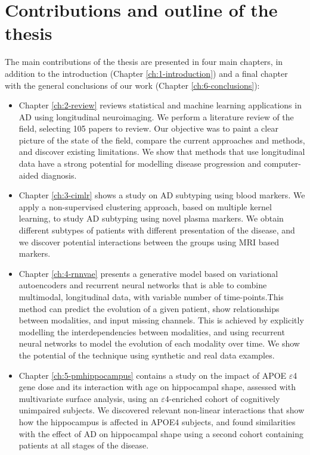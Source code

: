 \section{Contributions and outline of the thesis}

The main contributions of the thesis are presented in four main chapters, in addition to the introduction (Chapter \ref{ch:1-introduction}) and a final chapter with the general conclusions of our work (Chapter \ref{ch:6-conclusions}):

\begin{itemize}
    \item Chapter \ref{ch:2-review} reviews statistical and machine learning applications in AD using longitudinal neuroimaging. We perform a literature review of the field, selecting 105 papers to review. Our objective was to paint a clear picture of the state of the field, compare the current approaches and methods, and discover existing limitations. We show that methods that use longitudinal data have a strong potential for modelling disease progression and computer-aided diagnosis. 
    \item Chapter \ref{ch:3-cimlr} shows a study on AD subtyping using blood markers. We apply a non-supervised clustering approach, based on multiple kernel learning, to study AD subtyping using novel plasma markers. We obtain different subtypes of patients with different presentation of the disease, and we discover potential interactions between the groups using MRI based markers.
    \item Chapter \ref{ch:4-rnnvae} presents a generative model based on variational autoencoders and recurrent neural networks that is able to combine multimodal, longitudinal data, with variable number of time-points.This method can predict the evolution of a given patient, show relationships between modalities, and input missing channels. This is achieved by explicitly modelling the interdependencies between modalities, and using recurrent neural networks to model the evolution of each modality over time. We show the potential of the technique using synthetic and real data examples.
    \item Chapter \ref{ch:5-pmhippocampus} contains a study on the impact of APOE $\varepsilon$4 gene dose and its interaction with age on hippocampal shape, assessed with multivariate surface analysis, using an $\varepsilon$4-enriched cohort of cognitively unimpaired subjects. We discovered relevant non-linear interactions that show how the hippocampus is affected in APOE4 subjects, and found similarities with the effect of AD on hippocampal shape using a second cohort containing patients at all stages of the disease.
\end{itemize}

